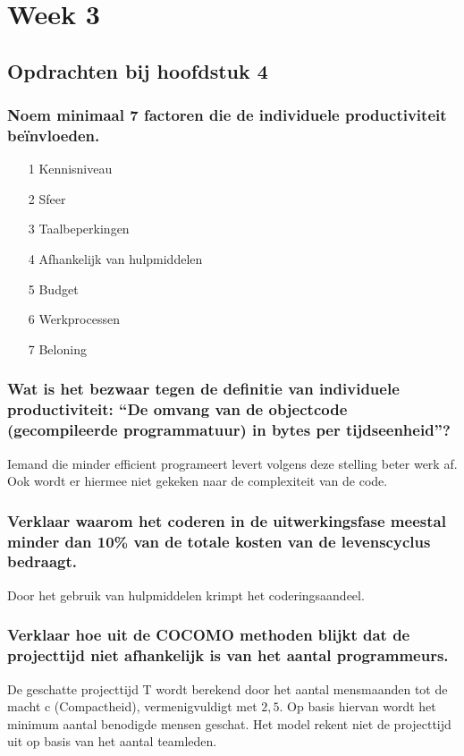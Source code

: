 \documentclass[a4paper,titlepage]{artikel1}
\begin{document}
 \section{Week 3}
  \subsection{Opdrachten bij hoofdstuk 4}
   \subsubsection[Opdracht 1]{Noem minimaal 7 factoren die de individuele productiviteit be\"invloeden.}
   \begin{itemize}
    \item[1] Kennisniveau
    \item[2] Sfeer
    \item[3] Taalbeperkingen
    \item[4] Afhankelijk van hulpmiddelen
    \item[5] Budget
    \item[6] Werkprocessen
    \item[7] Beloning
   \end{itemize}
   
   \subsubsection[Opdracht 2]{Wat is het bezwaar tegen de definitie van
   individuele productiviteit: ``De omvang van de objectcode
   (gecompileerde programmatuur) in bytes per tijdseenheid''?}
   Iemand die minder efficient programeert levert volgens deze stelling beter werk af. Ook wordt er hiermee niet gekeken naar de complexiteit van de code.
   
   \subsubsection[Opdracht 3]{Verklaar waarom het coderen in de
   uitwerkingsfase meestal minder dan 10\% van de totale kosten van de levenscyclus bedraagt.}
   Door het gebruik van hulpmiddelen krimpt het coderingsaandeel.
   
   \subsubsection[Opdracht 4]{Verklaar hoe uit de COCOMO methoden blijkt dat de projecttijd niet afhankelijk is van het aantal programmeurs.}
   De geschatte projecttijd T wordt berekend door het aantal mensmaanden tot de macht c (Compactheid), vermenigvuldigt met $2,5$. Op basis hiervan wordt het minimum aantal benodigde mensen geschat. Het model rekent niet de projecttijd uit op basis van het aantal teamleden.
\end{document}
